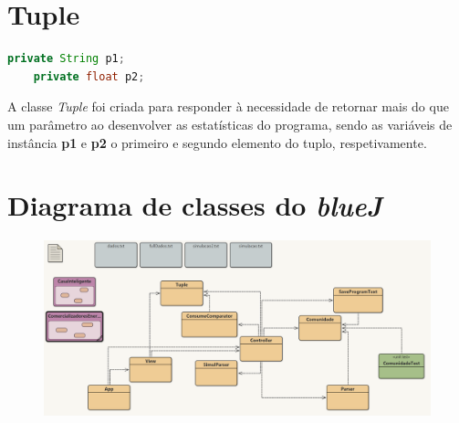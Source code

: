\documentclass[11pt,a4paper]{report}
\begin{document}
    \section{Tuple}
    \begin{lstlisting}[language=java,firstnumber=1]
    private String p1;
    private float p2;
    \end{lstlisting}
    
    A classe \textit{Tuple} foi criada para responder à necessidade de retornar mais do que um parâmetro ao desenvolver as estatísticas do programa, sendo as variáveis de instância \textbf{p1} e \textbf{p2} o primeiro e segundo elemento do tuplo, respetivamente.
    
	\pagebreak
	
	\section{Diagrama de classes do \textit{blueJ}}
	
	\begin{figure}[H]
			\includegraphics[scale=0.16]{diagrama1.png}
	\end{figure}
	
\end{document}
